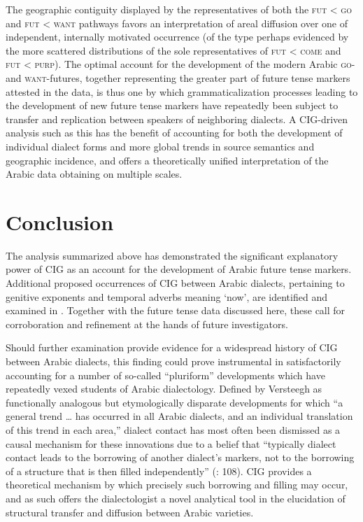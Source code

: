 \documentclass[output=paper]{langsci/langscibook}
\begin{document}
The geographic contiguity displayed by the representatives of both the \textsc{fut} < \textsc{go} and \textsc{fut} < \textsc{want} pathways favors an interpretation of areal diffusion over one of independent, internally motivated occurrence (of the type perhaps evidenced by the more scattered distributions of the sole representatives of \textsc{fut} < \textsc{come} and \textsc{fut} < \textsc{purp}). The optimal account for the development of the modern Arabic \textsc{go-} and \textsc{want-}futures, together representing the greater part of future tense markers attested in the data, is thus one by which grammaticalization processes leading to the development of new future tense markers have repeatedly been subject to transfer and replication between speakers of neighboring dialects. A CIG-driven analysis such as this has the benefit of accounting for both the development of individual dialect forms and more global trends in source semantics and geographic incidence, and offers a theoretically unified interpretation of the Arabic data obtaining on multiple scales.

\section{ Conclusion}

The analysis summarized above has demonstrated the significant explanatory power of CIG as an account for the development of Arabic future tense markers. Additional proposed occurrences of CIG between Arabic dialects, pertaining to genitive exponents and temporal adverbs meaning ‘now’, are identified and examined in \citet{Leddy-Cecere2018}. Together with the future tense data discussed here, these call for corroboration and refinement at the hands of future investigators.

Should further examination provide evidence for a widespread history of CIG between Arabic dialects, this finding could prove instrumental in satisfactorily accounting for a number of so-called “pluriform” developments which have repeatedly vexed students of Arabic dialectology. Defined by Versteegh as functionally analogous but etymologically disparate developments for which “a general trend … has occurred in all Arabic dialects, and an individual translation of this trend in each area,” dialect contact has most often been dismissed as a causal mechanism for these innovations due to a belief that “typically dialect contact leads to the borrowing of another dialect’s markers, not to the borrowing of a structure that is then filled independently” (\citeyear{Versteegh1997}: 108). CIG provides a theoretical mechanism by which precisely such borrowing and filling may occur, and as such offers the dialectologist a novel analytical tool in the elucidation of structural transfer and diffusion between Arabic varieties.
\end{document}

